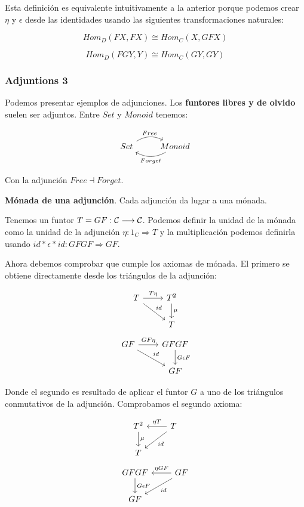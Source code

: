 \documentclass[11pt]{article}
\begin{document}
Esta definición es equivalente intuitivamente a la anterior porque
podemos crear $\eta$ y $\epsilon$ desde las identidades usando las
siguientes transformaciones naturales:

\[Hom_D(FX,FX) \cong Hom_C(X,GFX)\]

\[Hom_D(FGY,Y) \cong Hom_C(GY,GY)\]

\subsubsection*{Adjuntions 3}
\label{sec-2-1-3}
Podemos presentar ejemplos de adjunciones.
Los \textbf{funtores libres y de olvido} suelen ser adjuntos. Entre $Set$ y $Monoid$ tenemos:

\[ \begin{tikzcd}
{Set} \arrow[bend left]{r}{Free} & {Monoid} \arrow[bend left]{l}{Forget}
\end{tikzcd}
\]

Con la adjunción $Free \dashv Forget$. 

\begin{theorem}
\textbf{Mónada de una adjunción}. Cada adjunción da lugar a una mónada.
\end{theorem}

Tenemos un funtor $T = GF : {\cal C}  \longrightarrow {\cal C}$. Podemos definir la unidad de
la mónada como la unidad de la adjunción $\eta : 1_C \Longrightarrow T$ y la
multiplicación podemos definirla usando $id \ast \epsilon \ast id : GFGF \Longrightarrow GF$.

Ahora debemos comprobar que cumple los axiomas de mónada. El primero
se obtiene directamente desde los triángulos de la adjunción:

\[ \begin{tikzcd}
T \arrow{r}{T\eta} \arrow{dr}{id} & T^2 \arrow{d}{\mu} \\
 & T
\end{tikzcd}   
\]   \[ \begin{tikzcd}
GF \arrow{r}{GF\eta} \arrow{dr}{id} & GFGF \arrow{d}{G \epsilon F} \\
 & GF
\end{tikzcd}   
\]

Donde el segundo es resultado de aplicar el funtor $G$ a uno de los triángulos conmutativos
de la adjunción. Comprobamos el segundo axioma:

\[ \begin{tikzcd}
T^2 \arrow{d}{\mu} & T \arrow{dl}{id} \arrow{l}[swap]{\eta T} \\
T
\end{tikzcd}   
\]   \[ \begin{tikzcd}
GFGF \arrow{d}{G \epsilon F} & GF \arrow{dl}{id} \arrow{l}[swap]{\eta GF} \\
GF
\end{tikzcd}   
\]
\end{document}
